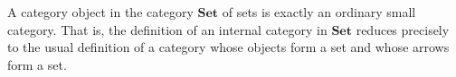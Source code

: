 A category object in the category $\mathbf{Set}$ of sets is exactly an ordinary small category. That is, the definition of an internal category in $\mathbf{Set}$ reduces precisely to the usual definition of a category whose objects form a set and whose arrows form a set.
